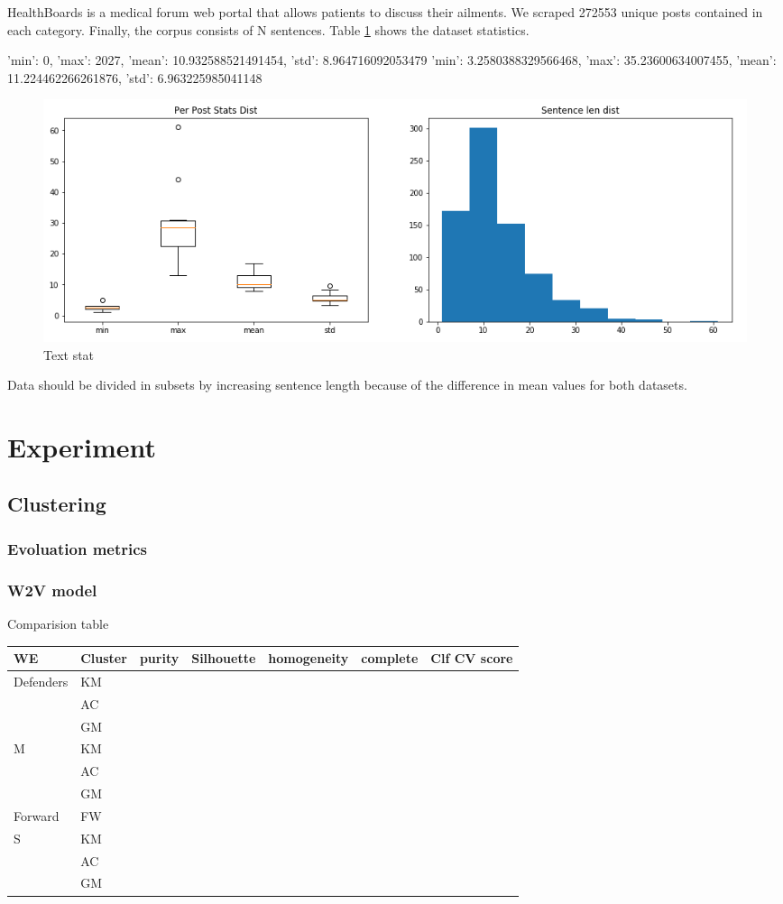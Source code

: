 \documentclass[11pt]{article}
\begin{document}
HealthBoards is a medical forum web portal that allows patients to discuss their ailments.
We scraped 272553 unique posts contained in each category. Finally, the corpus consists of N  sentences. Table \ref{visina8} shows the dataset statistics.


{'min': 0, 'max': 2027, 'mean': 10.932588521491454, 'std': 8.964716092053479}
{'min': 3.2580388329566468, 'max': 35.23600634007455, 'mean': 11.224462266261876, 'std': 6.963225985041148}


 \begin{figure}[h]
 	\centering
 	\includegraphics[scale=0.5]{report3.png}
	\caption{Text stat}\label{visina8}
 \end{figure}

Data should be divided in subsets by increasing sentence length because of the difference in mean values for both datasets.



\section{Experiment}

\subsection{Clustering}
\subsubsection{Evoluation metrics}
\subsubsection{W2V model}

Comparision table

\begin{tabular}{ |p{2cm}|p{1cm}|c|c|c|c|p{1cm}| }
\hline
WE & Cluster & purity & Silhouette & homogeneity & complete & Clf CV score \\ \hline
\multirow{3}{*}{Defenders} & KM & & & & &\\
 & AC & & & & &\\
 & GM & & & & &\\ \hline
\multirow{3}{*}{M} & KM & & & & &\\
 & AC & & & & &\\
 & GM & & & & &\\ \hline
Forward & FW & & & & &\\ \hline
\multirow{3}{*}{S} & KM & & & & &\\
 & AC & & & & &\\
 & GM & & & & &\\
\hline
\end{tabular}
\end{document}
